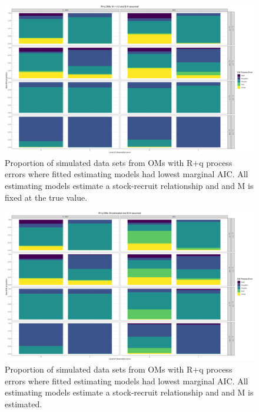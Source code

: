 \documentclass[
  12pt,
]{article}
\begin{document}
\begin{landscape}
\begin{figure}
\caption{Proportion of simulated data sets from OMs with R+q process errors where fitted estimating models had lowest marginal AIC. All estimating models estimate a stock-recruit relationship and and M is fixed at the true value.} \label{q_om_proportion_best_aic_SR_MF}
\begin{center}
\includegraphics[width = \textwidth]{q_om_proportion_best_aic_SR_MF.png}
\end{center}
\end{figure}
\end{landscape}

\begin{landscape}
\begin{figure}
\caption{Proportion of simulated data sets from OMs with R+q process errors where fitted estimating models had lowest marginal AIC. All estimating models estimate a stock-recruit relationship and and M is estimated.} \label{q_om_proportion_best_aic_SR_ME}
\begin{center}
\includegraphics[width = \textwidth]{q_om_proportion_best_aic_SR_ME.png}
\end{center}
\end{figure}
\end{landscape}
\end{document}
